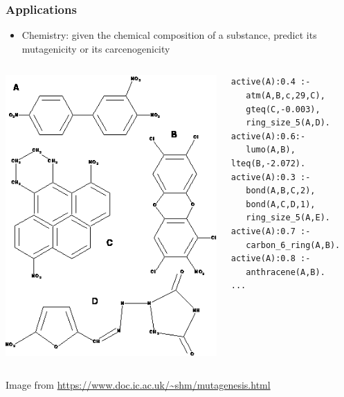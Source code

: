 \documentclass[trans]{beamer}
\begin{document}
\begin{frame}[fragile]
  \frametitle{Applications}
\begin{itemize}
\item Chemistry: given the chemical composition of a substance, predict its mutagenicity or its carcenogenicity
  \end{itemize}
		\begin{columns}
	\begin{column}{0.5\textwidth}
\begin{center}
\includegraphics[scale=0.425]{mutagens.png}
\end{center}
\end{column}
\begin{column}{0.5\textwidth}
\begin{footnotesize}
\begin{verbatim}
active(A):0.4 :-
   atm(A,B,c,29,C),
   gteq(C,-0.003),
   ring_size_5(A,D).
active(A):0.6:-
   lumo(A,B), lteq(B,-2.072).
active(A):0.3 :-
   bond(A,B,C,2),
   bond(A,C,D,1),
   ring_size_5(A,E).
active(A):0.7 :-
   carbon_6_ring(A,B).
active(A):0.8 :-
   anthracene(A,B).
...
\end{verbatim}
\end{footnotesize}
\end{column}
\end{columns}
\begin{tiny}
Image from \url{https://www.doc.ic.ac.uk/~shm/mutagenesis.html}
\end{tiny}

\end{frame}
\end{document}
